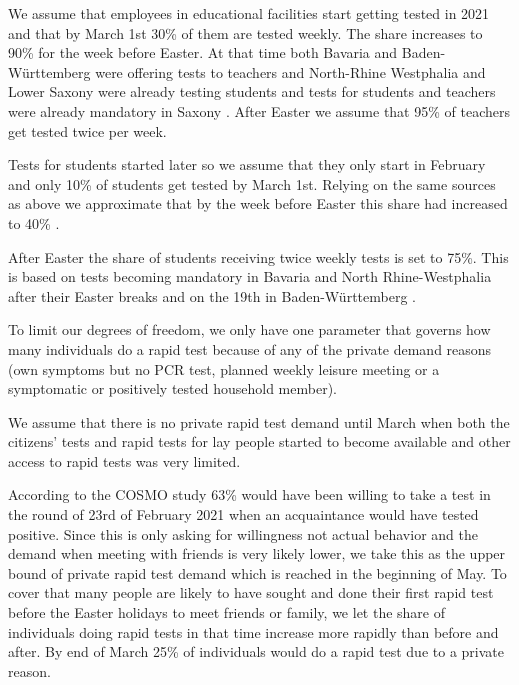 
We assume that employees in educational facilities start getting tested in 2021 and that
by March 1st 30\% of them are tested weekly. The share increases to 90\% for the week
before Easter. At that time both Bavaria \citep{STMGP2021} and Baden-Württemberg
\citep{MinisteriumKultus2021} were offering tests to teachers and North-Rhine Westphalia
\citep{SchulministeriumNRW2021} and Lower Saxony \citep{NSMK2021} were already testing
students and tests for students and teachers were already mandatory in Saxony
\citep{SMK2021}. After Easter we assume that 95\% of teachers get tested twice per week.

Tests for students started later \citep{MinisteriumKultus2021, SchulministeriumNRW2021}
so we assume that they only start in February and only 10\% of students get tested by
March 1st. Relying on the same sources as above we approximate that by the week before
Easter this share had increased to 40\% \citep{SchulministeriumNRW2021}.

After Easter the share of students receiving twice weekly tests is set to 75\%. This is
based on tests becoming mandatory in Bavaria \citep{BayerischeStaatskanzlei2021} and
North Rhine-Westphalia \citep{SchulministeriumNRW2021b} after their Easter breaks and
on the 19th in Baden-Württemberg \citep{KMBaWue2021}.


To limit our degrees of freedom, we only have one parameter that governs how many
individuals do a rapid test because of any of the private demand reasons (own symptoms
but no PCR test, planned weekly leisure meeting or a symptomatic or positively tested
household member).

We assume that there is no private rapid test demand until March when both the citizens'
tests and rapid tests for lay people started to become available
\citep{Bundesanzeiger2021a, Bundesregierung2021} and other access to rapid tests was very
limited.

According to the COSMO study \citep{Betsch2021a} 63\% would have been willing to take a
test in the round of 23rd of February 2021 when an acquaintance would have tested
positive. Since this is only asking for willingness not actual behavior and the demand
when meeting with friends is very likely lower, we take this as the upper bound of
private rapid test demand which is reached in the beginning of May. To cover that many
people are likely to have sought and done their first rapid test before the Easter
holidays to meet friends or family, we let the share of individuals doing rapid tests in
that time increase more rapidly than before and after. By end of March 25\% of
individuals would do a rapid test due to a private reason.

